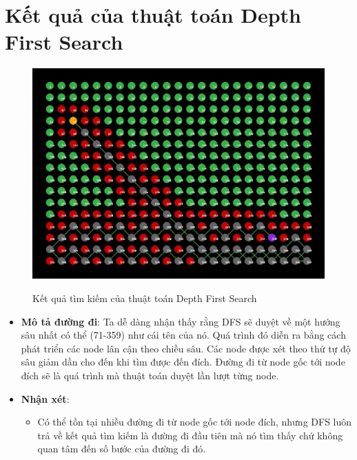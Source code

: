\section{Kết quả của thuật toán Depth First Search}
\begin{figure}[H]
    \centering
    \includegraphics[scale=0.4]{pic/DFS.jpg}
    \label{fig:my_label}
    \caption{Kết quả tìm kiếm của thuật toán Depth First Search}
\end{figure}
\begin{itemize}
    \item \textbf{Mô tả đường đi}: Ta dễ dàng nhận thấy rằng DFS sẽ duyệt về một hướng sâu nhất có thể (71-359) như cái tên của nó. Quá trình đó diễn ra bằng cách phát triển các node lân cận theo chiều sâu. Các node được xét theo thứ tự độ sâu giảm dần cho đến khi tìm được đến đích. Đường đi từ node gốc tới node đích sẽ là quá trình mà thuật toán duyệt lần lượt từng node. 
    \item \textbf{Nhận xét}: 
    \begin{itemize}
        \item Có thể tồn tại nhiều đường đi từ node gốc tới node đích, nhưng DFS luôn trả về kết quả tìm kiếm là đường đi đầu tiên mà nó tìm thấy chứ không quan tâm đến số bước của đường đi đó.
    \end{itemize}
\end{itemize}

